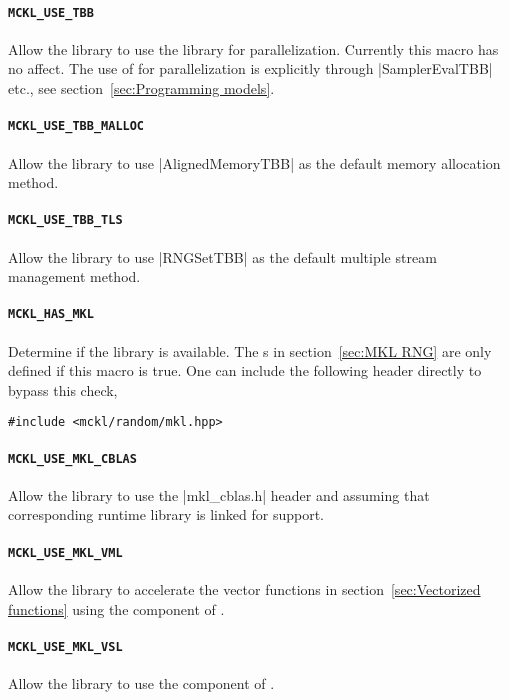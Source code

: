 \paragraph{\texttt{MCKL\_USE\_TBB}} Allow the library to use the \tbb library
for parallelization. Currently this macro has no affect. The use of \tbb for
parallelization is explicitly through |SamplerEvalTBB| etc., see
section~\ref{sec:Programming models}.

\paragraph{\texttt{MCKL\_USE\_TBB\_MALLOC}} Allow the library to use
|AlignedMemoryTBB| as the default memory allocation method.

\paragraph{\texttt{MCKL\_USE\_TBB\_TLS}} Allow the library to use |RNGSetTBB|
as the default multiple \rng stream management method.

\paragraph{\texttt{MCKL\_HAS\_MKL}} Determine if the \mkl library is available.
The \rng{}s in section~\ref{sec:MKL RNG} are only defined if this macro is
true. One can include the following header directly to bypass this check,
\begin{verbatim}
#include <mckl/random/mkl.hpp>
\end{verbatim}

\paragraph{\texttt{MCKL\_USE\_MKL\_CBLAS}} Allow the library to use the
|mkl_cblas.h| header and assuming that corresponding runtime library is linked
for \blas support.

\paragraph{\texttt{MCKL\_USE\_MKL\_VML}} Allow the library to accelerate the
vector functions in section~\ref{sec:Vectorized functions} using the \vml
component of \mkl.

\paragraph{\texttt{MCKL\_USE\_MKL\_VSL}} Allow the library to use the \vsl
component of \mkl.

